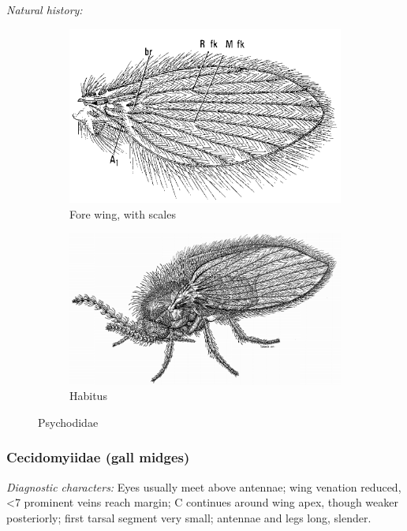 \documentclass[letterpaper, 11pt]{article}
\begin{document}
\noindent{}\textit{Natural history:} \\

\begin{figure}[ht!]
    \centering
    \begin{subfigure}[ht!]{0.4\textwidth}
        \includegraphics[width=\textwidth]{PsychodidWing}
        \caption{Fore wing, with scales \citep[][Fig. 17.11]{mcalpine1981manual}}
        \label{fig:psychodid1}
    \end{subfigure}
    \qquad
    \begin{subfigure}[ht!]{0.45\textwidth}
        \includegraphics[width=\textwidth]{PsychodidHabitus}
        \caption{Habitus \citep[][Fig. 17.1]{mcalpine1981manual}}
        \label{fig:psychodid2}
    \end{subfigure}
    \caption{Psychodidae}\label{fig:psychodids}
\end{figure}

\subsubsection{Cecidomyiidae (gall midges)}
\noindent{}\textit{Diagnostic characters:} Eyes usually meet above antennae; wing venation reduced, \textless7 prominent veins reach margin; C continues around wing apex, though weaker posteriorly; first tarsal segment very small; antennae and legs long, slender.\\%
\end{document}
